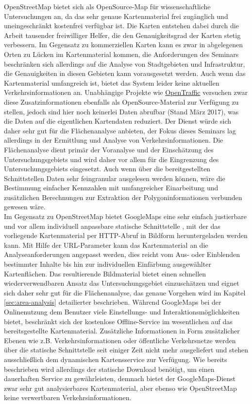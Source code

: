 OpenStreetMap bietet sich als OpenSource-Map für wissenschaftliche Untersuchungen an, da das sehr genaue Kartenmaterial frei zugänglich und uneingeschränkt kostenfrei verfügbar ist. Die Karten entstehen dabei durch die Arbeit tausender freiwilliger Helfer, die den Genauigkeitsgrad der Karten stetig verbessern. Im Gegensatz zu kommerziellen Karten kann es zwar in abgelegenen Orten zu Lücken im Kartenmaterial kommen, die Anforderungen des Seminars beschränken sich allerdings auf die Analyse von Stadtgebieten und Infrastruktur, die Genauigkeiten in diesen Gebieten kann vorausgesetzt werden. Auch wenn das Kartenmaterial umfangreich ist, bietet das System leider keine aktuellen Verkehrsinformationen an. Unabhängige Projekte wie \href{http://opentraffic.io/}{OpenTraffic} versuchen zwar diese Zusatzinformationen ebenfalls als OpenSource-Material zur Verfügung zu stellen, jedoch sind hier noch keinerlei Daten abrufbar (Stand März 2017), was die Daten auf die eigentlichen Kartendaten reduziert. Der Dienst würde sich daher sehr gut für die Flächenanalyse anbieten, der Fokus dieses Seminars lag allerdings in der Ermittlung und Analyse von  Verkehrsinformationen. Die Flächenanalyse dient primär der Voranalyse und der Einschätzung des Untersuchungsgebiets und wird daher vor allem für die Eingrenzung des Untersuchungsgebiets eingesetzt. Auch wenn über die bereitgestellten Schnittstellen Daten sehr feingranular ausgelesen werden können, wäre die Bestimmung einfacher Kennzahlen mit umfangreicher Einarbeitung und zusätzlichen Berechnungen zur Extraktion der Polygoninformationen verbunden gewesen wäre.\\

Im Gegensatz zu OpenStreetMap bietet GoogleMaps eine sehr einfach justierbare und vor allem individuell anpassbare statische Schnittstelle \cite{googlestaticmap}, mit der das vorliegende Kartenmaterial per HTTP-Abruf in Bildform heruntergeladen werden kann. Mit Hilfe der URL-Parameter kann das Kartenmaterial an die Analyseanforderungen angepasst werden, dies reicht vom Aus- oder Einblenden bestimmter Inhalte bis hin zur individuellen Einfärbung ausgewählter Kartenflächen. Das resultierende Bildmaterial bietet einen schnellen wiederverwendbaren Ansatz das Untersuchungsgebiet einzuschätzen und eignet sich daher sehr gut für die Flächenanalyse, das genaue Vorgehen wird im Kapitel \ref{sec:area-analysis} detailierter beschrieben. Während GoogleMaps bei der Onlinenutzung dem Benutzer viele Einstellungs- und Interaktionsmöglichkeiten bietet, beschränkt sich der kostenlose Offline-Service im wesentlichen auf das bereitsgestellte Kartenmaterial. Zusätzliche Informationen in Form zusätzlicher Ebenen wie z.B. Verkehrsinformationen oder öffentliche Verkehrsnetze werden über die statische Schnittstelle seit einiger Zeit nicht mehr ausgeliefert und stehen ausschließlich dem dynamischen Kartensservice zur Verfügung. Wie bereits beschrieben wird allerdings der statische Download benötigt, um einen dauerhaften Service zu gewährleisten, demnach bietet der GoogleMaps-Dienst zwar sehr gut analysierbares Kartenmaterial, aber ebenso wie OpenStreetMap keine verwertbaren Verkehrsinformationen.\\

